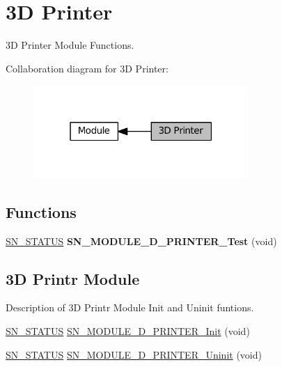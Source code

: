 \hypertarget{group__MODULE__3D__PRINTER}{}\section{3D Printer}
\label{group__MODULE__3D__PRINTER}


3D Printer Module Functions.  


Collaboration diagram for 3D Printer\+:\nopagebreak
\begin{figure}[H]
\begin{center}
\leavevmode
\includegraphics[width=232pt]{group__MODULE__3D__PRINTER}
\end{center}
\end{figure}
\subsection*{Functions}
\begin{DoxyCompactItemize}
\item 
\mbox{\label{group__MODULE__3D__PRINTER_ga31f1d937f766fc6699b39b625a10aaa5}} 
\hyperlink{group__SYSTEM__ERROR_ga4540713b9a7a18ce44d78c3a10f7442f}{S\+N\+\_\+\+S\+T\+A\+T\+US} {\bfseries S\+N\+\_\+\+M\+O\+D\+U\+L\+E\+\_\+D\+\_\+\+P\+R\+I\+N\+T\+E\+R\+\_\+\+Test} (void)
\end{DoxyCompactItemize}
\subsection*{3D Printr Module}
\label{_amgrp31919ac2a63e9801f2c4fb221e60d48f}%
Description of 3D Printr Module Init and Uninit funtions. \begin{DoxyCompactItemize}
\item 
\hyperlink{group__SYSTEM__ERROR_ga4540713b9a7a18ce44d78c3a10f7442f}{S\+N\+\_\+\+S\+T\+A\+T\+US} \hyperlink{group__MODULE__3D__PRINTER_ga801e265ffe6f8c56081112f4fdd35f39}{S\+N\+\_\+\+M\+O\+D\+U\+L\+E\+\_\+D\+\_\+\+P\+R\+I\+N\+T\+E\+R\+\_\+\+Init} (void)
\item 
\hyperlink{group__SYSTEM__ERROR_ga4540713b9a7a18ce44d78c3a10f7442f}{S\+N\+\_\+\+S\+T\+A\+T\+US} \hyperlink{group__MODULE__3D__PRINTER_ga776f5e31b0c0e176e35669f9432baec0}{S\+N\+\_\+\+M\+O\+D\+U\+L\+E\+\_\+D\+\_\+\+P\+R\+I\+N\+T\+E\+R\+\_\+\+Uninit} (void)
\end{DoxyCompactItemize}
